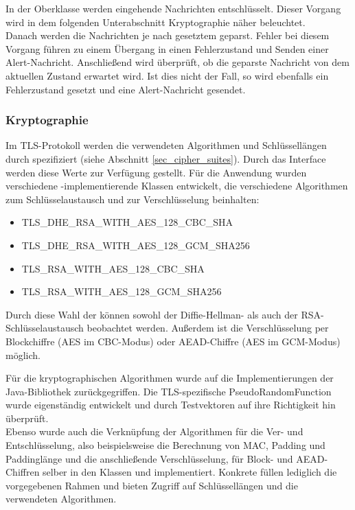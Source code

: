 In der Oberklasse  werden eingehende Nachrichten entschlüsselt. Dieser Vorgang wird in dem folgenden Unterabschnitt Kryptographie näher beleuchtet.\\
Danach werden die Nachrichten je nach gesetztem  geparst. Fehler bei diesem Vorgang führen zu einem Übergang in einen Fehlerzustand und Senden einer Alert-Nachricht. Anschließend wird überprüft, ob die geparste Nachricht von dem aktuellen Zustand erwartet wird. Ist dies nicht der Fall, so wird ebenfalls ein Fehlerzustand gesetzt und eine Alert-Nachricht gesendet.

\subsubsection{Kryptographie}
Im TLS-Protokoll werden die verwendeten Algorithmen und Schlüssellängen durch \ciphersuites{} spezifiziert (siehe Abschnitt \ref{sec_cipher_suites}). Durch das Interface  werden diese Werte zur Verfügung gestellt. Für die Anwendung wurden verschiedene -implementierende Klassen entwickelt, die verschiedene Algorithmen zum Schlüsselaustausch und zur Verschlüsselung beinhalten:
\begin{itemize}
\item TLS\_DHE\_RSA\_WITH\_AES\_128\_CBC\_SHA
\item TLS\_DHE\_RSA\_WITH\_AES\_128\_GCM\_SHA256
\item TLS\_RSA\_WITH\_AES\_128\_CBC\_SHA
\item TLS\_RSA\_WITH\_AES\_128\_GCM\_SHA256
\end{itemize}
Durch diese Wahl der \ciphersuites{} können sowohl der Diffie-Hellman- als auch der RSA-Schlüsselaustausch beobachtet werden. Außerdem ist die Verschlüsselung per Blockchiffre (AES im CBC-Modus) oder AEAD-Chiffre (AES im GCM-Modus) möglich.

Für die kryptographischen Algorithmen wurde auf die Implementierungen der Java-Bibliothek zurückgegriffen. Die TLS-spezifische PseudoRandomFunction wurde eigenständig entwickelt und durch Testvektoren auf ihre Richtigkeit hin überprüft.\\
Ebenso wurde auch die Verknüpfung der Algorithmen für die Ver- und Entschlüsselung, also beispielsweise die Berechnung von MAC, Padding und Paddinglänge und die anschließende Verschlüsselung, für Block- und AEAD-Chiffren selber in den Klassen  und  implementiert. Konkrete \ciphersuites{} füllen lediglich die vorgegebenen Rahmen und bieten Zugriff auf Schlüssellängen und die verwendeten Algorithmen.

